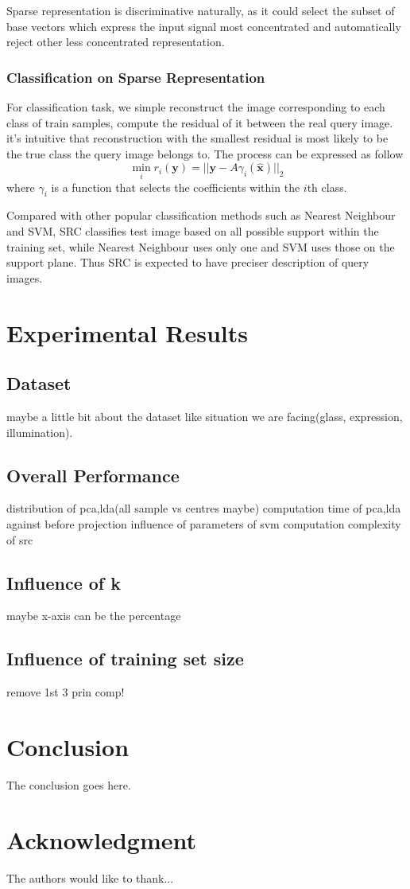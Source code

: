 \documentclass[conference]{IEEEtran}
\begin{document}
Sparse representation is discriminative naturally, as it could select the subset of base vectors which express the input signal most concentrated and automatically reject other less concentrated representation\cite{wangrobust}.
\subsubsection{Classification on Sparse Representation}
For classification task, we simple reconstruct the image corresponding to each class of train samples, compute the residual of it between the real query image. it's intuitive that reconstruction with the smallest residual is most likely to be the true class the query image belongs to. The process can be expressed as follow
\begin{equation}
	\min_{i}r_i(\bm{y})=||\bm{y}-A\gamma_i(\bm{\hat{x}})||_2
\end{equation} 
where $\gamma_i$ is a function that selects the coefficients within the $i$th class.

Compared with other popular classification methods such as Nearest Neighbour and SVM, SRC classifies test image based on all possible support within the training set\cite{wright2009robust}, while Nearest Neighbour uses only one and SVM uses those on the support plane. Thus SRC is expected to have preciser description of query images.
\section{Experimental Results}

\subsection{Dataset}
maybe a little bit about the dataset like situation we are facing(glass, expression, illumination).
\subsection{Overall Performance}
distribution of pca,lda(all sample vs centres maybe)
computation time of pca,lda against before projection
influence of parameters of svm
computation complexity of src
\subsection{Influence of k}
maybe x-axis can be the percentage
\subsection{Influence of training set size}
remove 1st 3 prin comp!


\section{Conclusion}
The conclusion goes here.






\section*{Acknowledgment}


The authors would like to thank...




\end{document}
